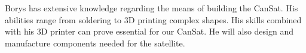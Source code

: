 \documentclass[class=report, crop=false]{standalone}
\begin{document}
Borys has extensive knowledge regarding the means of building the CanSat.
His abilities range from soldering to 3D printing complex shapes.
His skills combined with his 3D printer can prove essential for our CanSat.
He will also design and manufacture components needed for the satellite.
\end{document}
